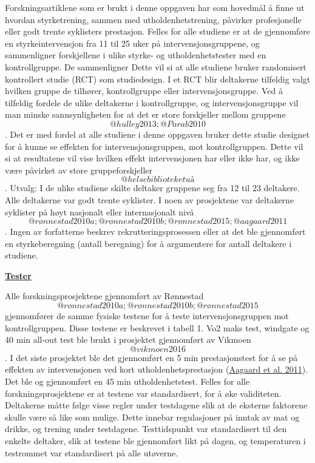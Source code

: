 \documentclass[
]{book}
\begin{document}
Forskningsartiklene som er brukt i denne oppgaven har som hovedmål å
finne ut hvordan styrketrening, sammen med utholdenhetstrening, påvirker
profesjonelle eller godt trente syklisters prestasjon. Felles for alle
studiene er at de gjennomføre en styrkeintervensjon fra 11 til 25 uker
på intervensjonsgruppene, og sammenligner forskjellene i ulike styrke-
og utholdenhetstester med en kontrollgruppe. De sammenligner Dette vil
si at alle studiene bruker randomisert kontrollert studie (RCT) som
studiedesign. I et RCT blir deltakerne tilfeldig valgt hvilken gruppe de
tilhører, kontrollgruppe eller intervensjonsgruppe. Ved å tilfeldig
fordele de ulike deltakerne i kontrollgruppe, og intervensjonsgruppe vil
man minske sannsynligheten for at det er store forskjeller mellom
gruppene \[@hulley2013; @Parab2010\]. Det er med fordel at alle studiene
i denne oppgaven bruker dette studie designet for å kunne se effekten
for intervensjonsgruppen, mot kontrollgruppen. Dette vil si at
resultatene vil vise hvilken effekt intervensjonen har eller ikke har,
og ikke være påvirket av store gruppeforskjeller \[@helsebiblioteketuå\]
. Utvalg: I de ulike studiene skilte deltaker gruppene seg fra 12 til 23
deltakere. Alle deltakerne var godt trente syklister. I noen av
prosjektene var deltakerne syklister på høyt nasjonalt eller
internasjonalt nivå
\[@rønnestad2010a; @rønnestad2010b; @rønnestad2015; @aagaard2011\].
Ingen av forfatterne beskrev rekrutteringsprosessen eller at det ble
gjennomført en styrkeberegning (antall beregning) for å argumentere for
antall deltakere i studiene.

\underline{\textbf{Tester}}

Alle forskningsprosjektene gjennomført av Rønnestad
\[@rønnestad2010a; @rønnestad2010b; @rønnestad2015\] gjennomfører de
samme fysiske testene for å teste intervensjonsgruppen mot
kontrollgruppen. Disse testene er beskrevet i tabell 1. Vo2 maks test,
windgate og 40 min all-out test ble brukt i prosjektet gjennomført av
Vikmoen \[@vikmoen2016\]. I det siste prosjektet ble det gjennomført en
5 min prestasjonstest for å se på effekten av intervensjonen ved kort
utholdenhetsprestasjon (\protect\hyperlink{ref-aagaard2011}{Aagaard et
al. 2011}). Det ble og gjennomført en 45 min utholdenhetstest. Felles
for alle forskningsprosjektene er at testene var standardisert, for å
øke validiteten. Deltakerne måtte følge visse regler under testdagene
slik at de eksterne faktorene skulle være så like som mulige. Dette
innebar regulasjoner på inntak av mat og drikke, og trening under
testdagene. Testtidspunkt var standardisert til den enkelte deltaker,
slik at testene ble gjennomført likt på dagen, og temperaturen i
testrommet var standardisert på alle utøverne.
\end{document}
